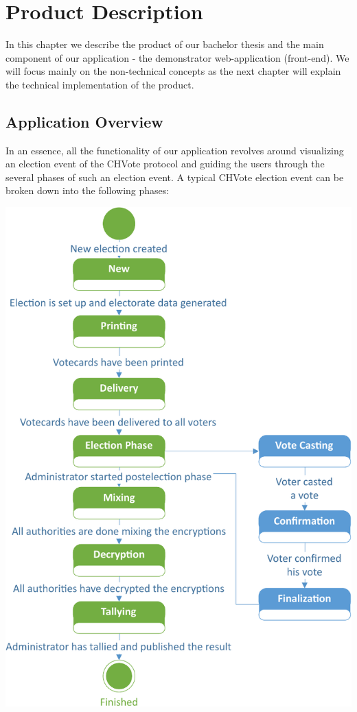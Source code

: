 \chapter{Product Description}
In this chapter we describe the product of our bachelor thesis and the main component of our application - the demonstrator web-application (front-end). We will focus mainly on the non-technical concepts as the next chapter will explain the technical implementation of the product.

\section{Application Overview}
In an essence, all the functionality of our application revolves around visualizing an election event of the CHVote protocol and guiding the users through the several phases of such an election event. A typical CHVote election event can be broken down into the following phases:

\begin{center}
\includegraphics[scale=0.65]{assets/electionStatediagram.pdf}
\label{Phases of an election-event}%
\end{center}

